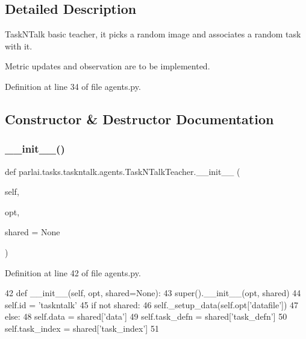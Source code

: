\subsection{Detailed Description}
\begin{DoxyVerb}TaskNTalk basic teacher, it picks a random image and associates a random task with
it.

Metric updates and observation are to be implemented.
\end{DoxyVerb}
 

Definition at line 34 of file agents.\+py.



\subsection{Constructor \& Destructor Documentation}
\mbox{\label{classparlai_1_1tasks_1_1taskntalk_1_1agents_1_1TaskNTalkTeacher_aa81863451740657e6bc1a7ba619f178d}} 
\subsubsection{\texorpdfstring{\+\_\+\+\_\+init\+\_\+\+\_\+()}{\_\_init\_\_()}}
{\footnotesize\ttfamily def parlai.\+tasks.\+taskntalk.\+agents.\+Task\+N\+Talk\+Teacher.\+\_\+\+\_\+init\+\_\+\+\_\+ (\begin{DoxyParamCaption}\item[{}]{self,  }\item[{}]{opt,  }\item[{}]{shared = {\ttfamily None} }\end{DoxyParamCaption})}



Definition at line 42 of file agents.\+py.


\begin{DoxyCode}
42     \textcolor{keyword}{def }\_\_init\_\_(self, opt, shared=None):
43         super().\_\_init\_\_(opt, shared)
44         self.id = \textcolor{stringliteral}{'taskntalk'}
45         \textcolor{keywordflow}{if} \textcolor{keywordflow}{not} shared:
46             self.\_setup\_data(self.opt[\textcolor{stringliteral}{'datafile'}])
47         \textcolor{keywordflow}{else}:
48             self.data = shared[\textcolor{stringliteral}{'data'}]
49             self.task\_defn = shared[\textcolor{stringliteral}{'task\_defn'}]
50             self.task\_index = shared[\textcolor{stringliteral}{'task\_index'}]
51 
\end{DoxyCode}


